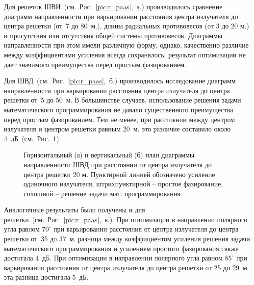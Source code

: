 Для решеток ШВИ~(см.~Рис.~\ref{pic:r_paas},~а.) производилось сравнение диаграмм направленности при варьировании расстояния центра излучателя до центра решетки (от~7 до 80~м.), длины радиальных противовесов (от 3 до 20 м.) и присутствия или отсутствия общей системы противовесов. Диаграммы направленности при этом имели различную форму, однако, качественно различие между коэффициентами усиления всегда сохранялось: результат оптимизации не дает значимого преимущества перед простым фазированием.

Для ШВД~(см.~Рис.~\ref{pic:r_paas},~б.) производилось исследование диаграмм направленности при варьировании расстояния центра излучателя до центра решетки от~5 до 50~м. В большинстве случаев, использование решения задачи математического программирования не давало существенного преимущества перед простым фазированием. Тем не менее, при расстоянии между центром излучателя и центром решетки равным 20~м. это различие составило около 4~дБ~(см.~Рис.~\ref{pic:r_bvd_result}).

\begin{figure}
\begin{minipage}[h]{0.49\linewidth}
\end{minipage}
\hfill
\begin{minipage}[h]{0.49\linewidth}
\end{minipage}
\caption{Горизонтальный (а) и вертикальный (б) план диаграммы направленности ШВД при расстоянии от центра излучателя до центра решетки 20 м. Пунктирной линией обозначено усиление одиночного излучателя, штрихпунктирной – простое фазирование, сплошной – решение задачи мат. программирования.}
\label{pic:r_bvd_result}
\end{figure}

Аналогичные результаты были получены и для решетки~(см.~Рис.~\ref{pic:r_paas},~в.). При оптимизации в направлении полярного угла равном $70^{\circ}$ при варьировании расстояния от центра излучателя до центра решетки от~35 до 37~м. разница между коэффициентом усиления решения задачи математического программирования и усилением простого фазирования также достигала 4~дБ.  При оптимизации в направлении полярного угла равном $85^{\circ}$ при варьировании расстояния от центра излучателя до центра решетки от 25 до 29~м. эта разница достигала 5~дБ.

